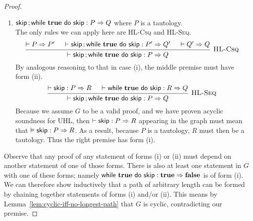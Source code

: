 \documentclass[10pt]{article}
\theoremstyle{definition}
\begin{document}
\begin{proof}
\begin{enumerate}[label=(\roman*)]
\item $\Triple {\Seq \Skip ; {\While {\True} do {\Skip}} } : P => Q$ where $P$ is a tautology. \\
    The only rules we can apply here are \textsc{HL-Csq} and \textsc{HL-Seq}.
%
    \[\begin{prooftree}
        \hypo{\VAL P \Rightarrow P'}
        \hypo{\DER \Triple {\Seq \Skip ; {\While {\True} do {\Skip}} } : P' => Q'}
        \hypo{\VAL Q' \Rightarrow Q}
        \infer3[\textsc{HL-Csq}] 
            {\DER \Triple {\Seq \Skip ; {\While {\True} do {\Skip}} } : P => Q}
    \end{prooftree}\]
%
    By analogous reasoning to that in case (i),
    the middle premise must have form (ii).
    \[\begin{prooftree}
        \hypo{\DER \Triple \Skip : P => R}
        \hypo{\DER \Triple {\While {\True} do {\Skip} } : R => Q}
        \infer2[\textsc{HL-Seq}] 
            {\DER \Triple {\Seq \Skip ; {\While {\True} do {\Skip}} } : P => Q}
    \end{prooftree}\]
%
    Because we assume $G$ to be a valid proof,
    and we have proven acyclic soundness for UHL,
    then $\DER \Triple \Skip : P => R$ appearing in the graph
    must mean that $\VAL \Triple \Skip : P => R$.
    As a result, because $P$ is a tautology, $R$ must then be a tautology.
    Thus the right premise has form (i).
    
\end{enumerate}

Observe that any proof of any statement of forms (i) or (ii)
must depend on another statement of one of those forms.
There is also at least one statement in $G$ with one of these forms;
namely 
$\Triple {\While {\True} do {\Skip} } : \True => \False$ is of form (i).
%
We can therefore show inductively that a path of arbitrary length
can be formed by chaining together statements of forms (i) and/or (ii).
This means by Lemma~\ref{lem:cyclic-iff-no-longest-path} that $G$ is cyclic, contradicting our premise.


\end{proof}
\end{document}
